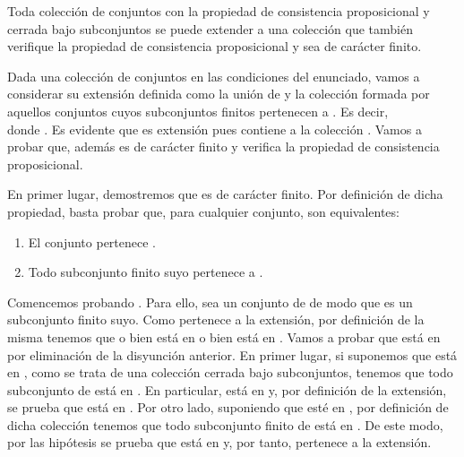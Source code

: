 \begin{isabellebody}
\begin{isamarkuptext}
 \begin{lema}
    Toda colección de conjuntos con la propiedad de consistencia proposicional y cerrada bajo 
    subconjuntos se puede extender a una colección que también verifique la propiedad de 
    consistencia proposicional y sea de carácter finito.
 \end{lema}

 \begin{demostracion}
   Dada una colección de conjuntos  en las condiciones del enunciado, vamos a considerar su 
   extensión  definida como la unión de  y la colección formada por aquellos conjuntos
   cuyos subconjuntos finitos pertenecen a . Es decir,\\  donde 
   . Es evidente que es extensión pues contiene 
   a la colección . Vamos a probar que, además es de carácter finito y verifica la 
   propiedad de consistencia proposicional.

   En primer lugar, demostremos que  es de carácter finito. Por definición de dicha propiedad, 
   basta probar que, para cualquier conjunto, son equivalentes:
   \begin{enumerate}
    \item El conjunto pertenece .
    \item Todo subconjunto finito suyo pertenece a .
   \end{enumerate}

   Comencemos probando . Para ello, sea un conjunto  de  de modo que  es un
   subconjunto finito suyo. Como  pertenece a la extensión, por definición de la misma tenemos
   que o bien  está en  o bien  está en . Vamos a probar que  está en  por
   eliminación de la disyunción anterior. En primer lugar, si suponemos que  está en , como
   se trata de una colección cerrada bajo subconjuntos, tenemos que todo subconjunto de  está en 
   . En particular,  está en  y, por definición de la extensión, se prueba
   que  está en . Por otro lado, suponiendo que  esté en , por definición de dicha 
   colección tenemos que todo subconjunto finito de  está en . De este modo, por las hipótesis 
   se prueba que  está en  y, por tanto, pertenece a la extensión. 


\end{demostracion}
\end{isamarkuptext}
\end{isabellebody}
